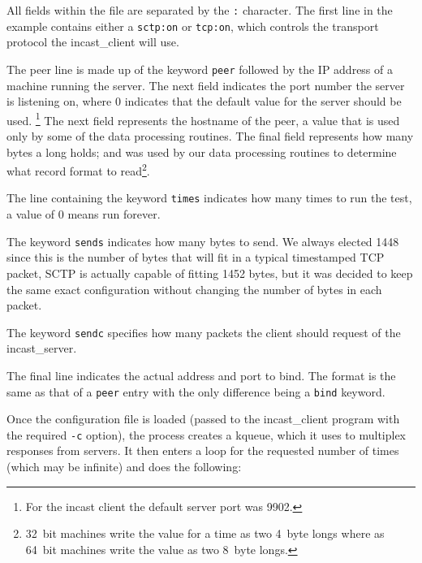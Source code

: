 \documentclass[12pt]{article}
\begin{document}
All fields within the file are separated by the \texttt{:} character.
The first line in the example contains either a \texttt{sctp:on} or
\texttt{tcp:on}, which controls the transport protocol
the incast\_client will use. 

The peer line is made up of the keyword \texttt{peer} followed by the IP address of a
machine running the server. The next field indicates the port  number the server is
listening on, where 0 indicates that the default value for the server
should be used. \footnote{For the incast
client the default server port was 9902.} The next field represents
the hostname of the peer, a value 
that is used only by some of the data processing routines. The final field represents how many bytes a
long holds; and was used by our data processing routines to determine what record format
to read\footnote{32~bit machines write the value for a time as two 4~byte longs where as 64~bit machines
write the value as two 8~byte longs.}.

The line containing the keyword \texttt{times} indicates how many times to run the test, a value of 0
means run forever.

The keyword \texttt{sends} indicates how many bytes to send. We always elected 1448 since this is
the number of bytes that will fit in a typical timestamped TCP packet, SCTP is actually capable
of fitting 1452 bytes, but it was decided to keep the same exact configuration without changing
the number of bytes in each packet.

The keyword \texttt{sendc} specifies how many packets the client should request of the incast\_server.

The final line indicates the actual address and port to bind. The format is the same as that
of a \texttt{peer} entry with the only difference being a \texttt{bind} keyword.

Once the configuration file is loaded (passed to the incast\_client program with the required
\texttt{-c} option), the process creates a kqueue, which it uses to multiplex responses from
servers. It then enters a loop for the requested number of times (which may be infinite) and
does the following:

\end{document}
